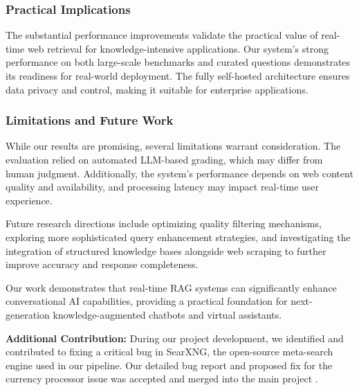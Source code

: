 \documentclass[fleqn,moreauthors,10pt]{ds_report}
\begin{document}
\subsubsection*{Practical Implications}
The substantial performance improvements validate the practical value of real-time web retrieval for knowledge-intensive applications. Our system's strong performance on both large-scale benchmarks and curated questions demonstrates its readiness for real-world deployment. The fully self-hosted architecture ensures data privacy and control, making it suitable for enterprise applications.

\subsubsection*{Limitations and Future Work}
While our results are promising, several limitations warrant consideration. The evaluation relied on automated LLM-based grading, which may differ from human judgment. Additionally, the system's performance depends on web content quality and availability, and processing latency may impact real-time user experience.

Future research directions include optimizing quality filtering mechanisms, exploring more sophisticated query enhancement strategies, and investigating the integration of structured knowledge bases alongside web scraping to further improve accuracy and response completeness.

Our work demonstrates that real-time RAG systems can significantly enhance conversational AI capabilities, providing a practical foundation for next-generation knowledge-augmented chatbots and virtual assistants.

\textbf{Additional Contribution:} During our project development, we identified and contributed to fixing a critical bug in SearXNG, the open-source meta-search engine used in our pipeline. Our detailed bug report and proposed fix for the currency processor issue was accepted and merged into the main project \cite{searxng_bug}.



\end{document}
